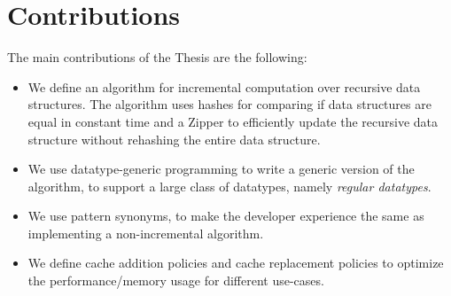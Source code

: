 \section{Contributions}

The main contributions of the Thesis are the following:

\begin{itemize}
    \item We define an algorithm for incremental computation over recursive data structures. The algorithm uses hashes for comparing if data structures are equal in constant time and a Zipper to efficiently update the recursive data structure without rehashing the entire data structure.
    \item We use datatype-generic programming to write a generic version of the algorithm, to support a large class of datatypes, namely \textit{regular datatypes}.
    \item We use pattern synonyms, to make the developer experience the same as implementing a non-incremental algorithm.
    \item We define cache addition policies and cache replacement policies to optimize the performance/memory usage for different use-cases.
\end{itemize}